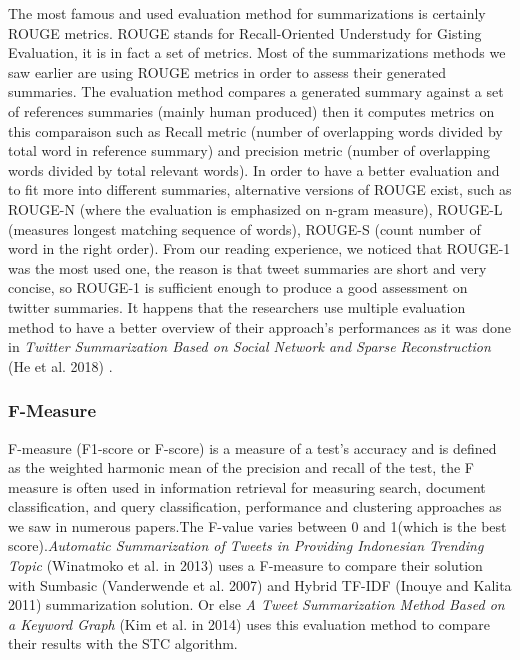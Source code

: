 \documentclass[runningheads]{llncs}
\begin{document}
The most famous and used evaluation method for summarizations is certainly ROUGE
metrics. ROUGE stands for Recall-Oriented Understudy for Gisting Evaluation, it
is in fact a set of metrics. Most of the summarizations methods we saw earlier
are using ROUGE metrics in order to assess their generated summaries.
The evaluation method compares a generated summary against a set of references
summaries (mainly human produced) then it computes metrics on this comparaison
such as Recall metric (number of overlapping words divided by total word in
reference summary) and precision metric (number of overlapping words divided by
total relevant words). In order to have a better evaluation and to fit more into
different summaries, alternative versions of ROUGE exist, such as ROUGE-N
(where the evaluation is emphasized on n-gram measure), ROUGE-L (measures
longest matching sequence of words), ROUGE-S (count number of word in the right
order). From our reading experience, we noticed that ROUGE-1 was the most used
one, the reason is that tweet summaries are short and very concise, so ROUGE-1
is sufficient enough to produce a good assessment on twitter summaries. It
happens that the researchers use multiple evaluation method to have a better
overview of their approach's performances as it was done in \textit{Twitter
Summarization Based on Social Network and Sparse Reconstruction} (He et al.
2018) \cite{he_twitter_nodate}.

\subsubsection{F-Measure}

F-measure (F1-score or F-score) is a measure of a test's accuracy and is
defined as the weighted harmonic mean of the precision and recall of the test,
the F measure is often used in information retrieval for measuring search,
document classification, and query classification, performance and clustering
approaches as we saw in numerous papers.The F-value varies between 0 and
1(which is the best score).\textit{Automatic Summarization of Tweets in
Providing Indonesian Trending Topic} (Winatmoko et al. in 2013)
\cite{winatmoko_automatic_2013} uses a F-measure to compare their solution with
Sumbasic (Vanderwende et al. 2007) \cite{vanderwende_beyond_2007} and Hybrid
TF-IDF (Inouye and Kalita 2011) \cite{inouye_comparing_2011} summarization
solution. Or else \textit{A Tweet Summarization Method Based on a Keyword
Graph} (Kim et al. in 2014) \cite{kim_tweet_2014} uses this evaluation method
to compare their results with the STC algorithm.
\end{document}
